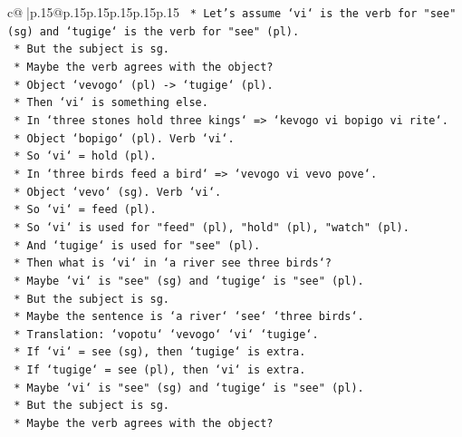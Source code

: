 \documentclass{article}
\begin{document}
{\begin{supertabular}{c@{$\;$}|p{.15\linewidth}@{}p{.15\linewidth}p{.15\linewidth}p{.15\linewidth}p{.15\linewidth}p{.15\linewidth}}
{{{\texttt{                *   Let's assume `vi` is the verb for "see" (sg) and `tugige` is the verb for "see" (pl).} \\
\texttt{                *   But the subject is sg.} \\
\texttt{                *   Maybe the verb agrees with the object?} \\
\texttt{                *   Object `vevogo` (pl) {-}> `tugige` (pl).} \\
\texttt{                *   Then `vi` is something else.} \\
\texttt{                *   In `three stones hold three kings` => `kevogo vi bopigo vi rite`.} \\
\texttt{                *   Object `bopigo` (pl). Verb `vi`.} \\
\texttt{                *   So `vi` = hold (pl).} \\
\texttt{                *   In `three birds feed a bird` => `vevogo vi vevo pove`.} \\
\texttt{                *   Object `vevo` (sg). Verb `vi`.} \\
\texttt{                *   So `vi` = feed (pl).} \\
\texttt{                *   So `vi` is used for "feed" (pl), "hold" (pl), "watch" (pl).} \\
\texttt{                *   And `tugige` is used for "see" (pl).} \\
\texttt{                *   Then what is `vi` in `a river see three birds`?} \\
\texttt{                *   Maybe `vi` is "see" (sg) and `tugige` is "see" (pl).} \\
\texttt{                *   But the subject is sg.} \\
\texttt{                *   Maybe the sentence is `a river` `see` `three birds`.} \\
\texttt{                *   Translation: `vopotu` `vevogo` `vi` `tugige`.} \\
\texttt{                *   If `vi` = see (sg), then `tugige` is extra.} \\
\texttt{                *   If `tugige` = see (pl), then `vi` is extra.} \\
\texttt{                *   Maybe `vi` is "see" (sg) and `tugige` is "see" (pl).} \\
\texttt{                *   But the subject is sg.} \\
\texttt{                *   Maybe the verb agrees with the object?} \\
}}}
\end{supertabular}}
\end{document}
